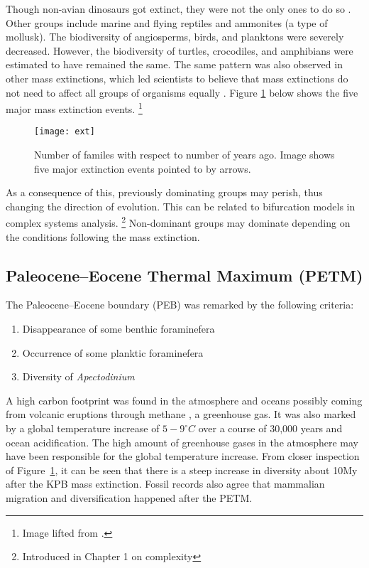 Though non-avian dinosaurs got extinct, they were not the only ones to do so \cite[p.456]{biomain}.
Other groups include marine and flying reptiles and ammonites (a type of mollusk).
The biodiversity of angiosperms, birds, and planktons were severely decreased.
However, the biodiversity of turtles, crocodiles, and amphibians were estimated to have remained the same.
The same pattern was also observed in other mass extinctions, which led scientists to believe that mass extinctions do not need to affect all groups of organisms equally \cite[p.456]{biomain}.
Figure \ref{fig:ext} below shows the five major mass extinction events.
\footnote{Image lifted from \cite[p.456]{biomain}.}

\begin{figure}
    \centering
    \texttt{[image: ext]}
    \caption{Number of familes with respect to number of years ago. Image shows five major extinction events pointed to by arrows.}
    \label{fig:ext}
\end{figure}

As a consequence of this, previously dominating groups may perish, thus changing the direction of evolution.
This can be related to bifurcation models in complex systems analysis.
\footnote{Introduced in Chapter 1 on complexity}
Non-dominant groups may dominate depending on the conditions following the mass extinction.

\subsection{Paleocene--Eocene Thermal Maximum (PETM)}
The Paleocene--Eocene boundary (PEB) was remarked by the following criteria:

\begin{enumerate}
    \item Disappearance of some benthic foraminefera
    \item Occurrence of some planktic foraminefera
    \item Diversity of \textit{Apectodinium}
\end{enumerate}

A high carbon footprint was found in the atmosphere and oceans possibly coming from volcanic eruptions through methane \cite{Keller2018}, a greenhouse gas.
It was also marked by a global temperature increase of $5-9 ^{\circ}C$ over a course of 30,000 years and ocean acidification.
The high amount of greenhouse gases in the atmosphere may have been responsible for the global temperature increase.
From closer inspection of Figure~\ref{fig:ext}, it can be seen that there is a steep increase in diversity about 10My after the KPB mass extinction.
Fossil records also agree that mammalian migration and diversification happened after the PETM.

